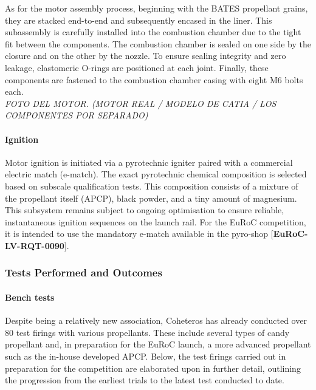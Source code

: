 \documentclass[11pt, a4paper]{article} %
\newcommand{\req}[1]{[\textcolor{EtseNavy}{\textbf{#1}}]}
\begin{document}
As for the motor assembly process, beginning with the BATES propellant grains, they are stacked end-to-end and subsequently encased in the liner. This subassembly is carefully installed into the combustion chamber due to the tight fit between the components. The combustion chamber is sealed on one side by the closure and on the other by the nozzle. To ensure sealing integrity and zero leakage, elastomeric O-rings are positioned at each joint. Finally, these components are fastened to the combustion chamber casing with eight M6 bolts each.\\

\textit{FOTO DEL MOTOR. (MOTOR REAL / MODELO DE CATIA / LOS COMPONENTES POR SEPARADO)}

\paragraph{Ignition}
Motor ignition is initiated via a pyrotechnic igniter paired with a commercial electric match (e-match). The exact pyrotechnic chemical composition is selected based on subscale qualification tests. This composition consists of a mixture of the propellant itself (APCP), black powder, and a tiny amount of magnesium. This subsystem remains subject to ongoing optimisation to ensure reliable, instantaneous ignition sequences on the launch rail. For the EuRoC competition, it is intended to use the mandatory e-match available in the pyro-shop \req{EuRoC-LV-RQT-0090}. 

\subsubsection{Tests Performed and Outcomes}
\label{Tests_Performed} 
\paragraph{Bench tests}

Despite being a relatively new association, Coheteros has already conducted over 80 test firings with various propellants. These include several types of candy propellant and, in preparation for the EuRoC launch, a more advanced propellant such as the in-house developed APCP. Below, the test firings carried out in preparation for the competition are elaborated upon in further detail, outlining the progression from the earliest trials to the latest test conducted to date.\\
\end{document}

